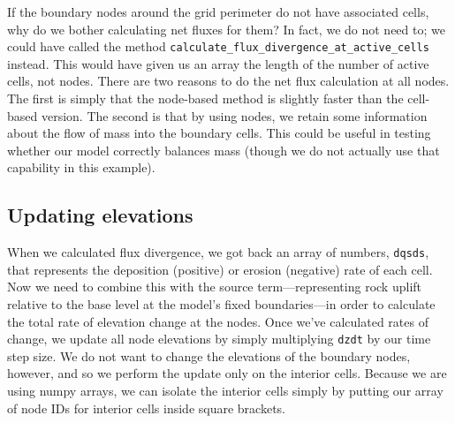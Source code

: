 \documentclass[12pt]{article}
\newcommand{\code}[1]{{\tt #1}}
\begin{document}
If the boundary nodes around the grid perimeter do not have associated cells, why do we bother calculating net fluxes for them? In fact, we do not need to; we could have called the method \code{calculate\_flux\_divergence\_at\_active\_cells} instead. This would have given us an array the length of the number of active cells, not nodes. There are two reasons to do the net flux calculation at all nodes. The first is simply that the node-based method is slightly faster than the cell-based version. The second is that by using nodes, we retain some information about the flow of mass into the boundary cells. This could be useful in testing whether our model correctly balances mass (though we do not actually use that capability in this example).

\newpage
\subsection{Updating elevations}



When we calculated flux divergence, we got back an array of numbers, \code{dqsds}, that represents the deposition (positive) or erosion (negative) rate of each cell. Now we need to combine this with the source term---representing rock uplift relative to the base level at the model's fixed boundaries---in order to calculate the total rate of elevation change at the nodes. Once we've calculated rates of change, we update all node elevations by simply multiplying \code{dzdt} by our time step size. We do not want to change the elevations of the boundary nodes, however, and so we perform the update only on the interior cells. Because we are using numpy arrays, we can isolate the interior cells simply by putting our array of node IDs for interior cells inside square brackets. 

%
%
%
\end{document}
